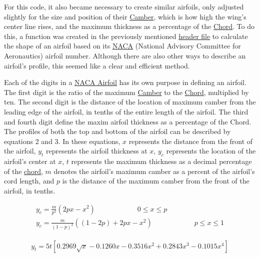 \documentclass{article}
\begin{document}
For this code, it also became necessary to create similar airfoils, only adjusted slightly for the size and position of their \hyperlink{Camber}{Camber}, which is how high the wing's center line rises, and the maximum thickness as a percentage of the \hyperlink{c}{Chord}. To do this, a function was created in the previously mentioned \href{https://github.com/JoeSpencer1/497R-Projects/blob/Airfoil-Analysis/Airfoil_Functions.jl}{header file} to calculate the shape of an airfoil based on its \hyperlink{NACA}{NACA} (National Advisory Committee for Aeronautics) airfoil number. Although there are also other ways to describe an airfoil's profile, this seemed like a clear and efficient method. \newline

Each of the digits in a \hyperlink{NACA}{NACA Airfoil} has its own purpose in defining an airfoil. The first digit is the ratio of the maximum \hyperlink{Camber}{Camber} to the \hyperlink{c}{Chord}, multiplied by ten. The second digit is the distance of the location of maximum camber from the leading edge of the airfoil, in tenths of the entire length of the airfoil. The third and fourth digit define the maxim airfoil thickness as a percentage of the Chord. The profiles of both the top and bottom of the airfoil can be described by equations 2 and 3. In these equations, $x$ represents the distance from the front of the airfoil, $y_{t}$ represents the airfoil thickness at $x$, $y_{c}$ represents the location of the airfoil's center at $x$, $t$ represents the maximum thickness as a decimal percentage of the \hyperlink{c}{chord}, $m$ denotes the airfoil's maximum camber as a percent of the airfoil's cord length, and $p$ is the distance of the maximum camber from the front of the airfoil, in tenths. \newline

\begin{equation} \label{eq:2}
\begin{aligned}
	y_{c} = \frac{m}{p^2} (2 p x - x^2) \qquad \qquad \qquad 0 \leq x \leq p \\
	y_{c} = \frac{m}{(1 - p)^2} ((1 - 2 p) + 2 p x - x^2) \qquad \qquad \qquad p \leq x \leq 1
\end{aligned}
\end{equation}

\begin{equation} \label{eq:3}
\begin{aligned}
	y_{t} = 5 t [ 0.2969 \sqrt{x} - 0.1260 x - 0.3516 x^{2} + 0.2843 x^{3} - 0.1015 x^{4}]
\end{aligned}
\end{equation}
\end{document}
